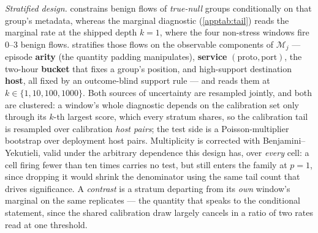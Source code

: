 \emph{Stratified design.}  constrains benign flows of \emph{true-null} groups
conditionally on that group's metadata, whereas the marginal diagnostic (\cref{apptab:tail}) reads the
marginal rate at the shipped depth $k{=}1$, where the four non-stress windows fire $0$--$3$ benign
flows.  stratifies those flows on the observable components of $\mathcal{M}_j$
--- episode \textbf{arity} (the quantity padding manipulates), \textbf{service}
$(\text{proto},\text{port})$, the two-hour \textbf{bucket} that fixes a group's position, and
high-support destination \textbf{host}, all fixed by an outcome-blind support rule --- and reads them
at $k\in\{1,10,100,1000\}$. Both sources of uncertainty are resampled jointly, and both are clustered:
a window's whole diagnostic depends on the calibration set only through its $k$-th largest score, which
every stratum shares, so the calibration tail is resampled over calibration \emph{host pairs}; the test
side is a Poisson-multiplier bootstrap over deployment host pairs. Multiplicity is corrected with
Benjamini--Yekutieli, valid under the arbitrary dependence this design has, over \emph{every} cell: a
cell firing fewer than ten times carries no test, but still enters the family at $p=1$, since dropping
it would shrink the denominator using the same tail count that drives significance. A \emph{contrast}
is a stratum departing from its \emph{own} window's marginal on the same replicates --- the quantity
that speaks to the conditional statement, since the shared calibration draw largely cancels in a ratio
of two rates read at one threshold.


